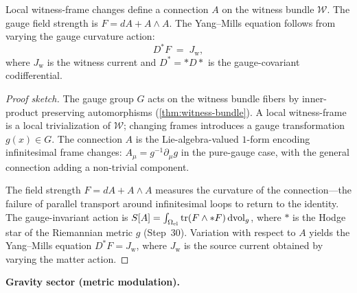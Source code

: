 \begin{theorem}
\label{thm:yang-mills}
Local witness-frame changes define a connection $A$ on the witness bundle
$\mathcal{W}$.  The gauge field strength is
$F = dA + A \wedge A$.  The Yang--Mills equation follows from varying the
gauge curvature action:
\[
  D^* F \;=\; J_{\mathrm{w}},
\]
where $J_{\mathrm{w}}$ is the witness current and $D^* = *D*$ is the
gauge-covariant codifferential.
\begin{proof}[Proof sketch]
The gauge group $G$ acts on the witness bundle fibers by inner-product
preserving automorphisms (\cref{thm:witness-bundle}).  A local
witness-frame is a local trivialization of $\mathcal{W}$; changing frames
introduces a gauge transformation $g(x) \in G$.  The connection $A$ is the
Lie-algebra-valued $1$-form encoding infinitesimal frame changes:
$A_\mu = g^{-1} \partial_\mu g$ in the pure-gauge case, with the general
connection adding a non-trivial component.

The field strength $F = dA + A \wedge A$ measures the curvature of the
connection---the failure of parallel transport around infinitesimal loops
to return to the identity.  The gauge-invariant action is
$S[A] = \int_{\Omega_{\mathrm{cl}}} \mathrm{tr}(F \wedge *F)\, \mathrm{dvol}_g$,
where $*$ is the Hodge star of the Riemannian metric $g$ (Step~30).
Variation with respect to $A$ yields the Yang--Mills equation
$D^* F = J_{\mathrm{w}}$, where $J_{\mathrm{w}}$ is the source current
obtained by varying the matter action.

\end{proof}
\end{theorem}

\bigskip
\noindent\textbf{Gravity sector (metric modulation).}

